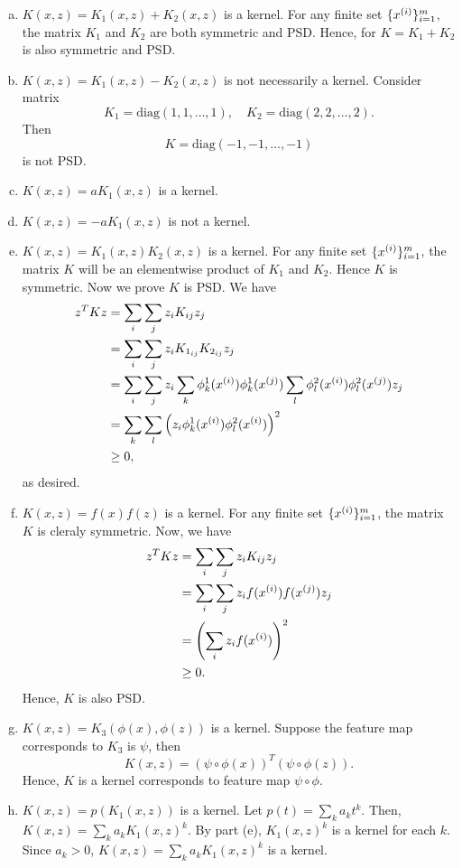 \documentclass[12pt,letterpaper,boxed]{hmcpset}
\renewcommand{\diag}{\mathrm{diag}}
\begin{document}
\begin{solution}
  \begin{enumerate}[(a)]
    \item $K(x,z) = K_1(x,z) + K_2(x,z)$ is a kernel. For any finite set $\{\xx\}_{i=1}^m$, the matrix $K_1$ and $K_2$ are both symmetric and PSD. Hence, for $K = K_1 + K_2$ is also symmetric and PSD.
    
    \item $K(x,z) = K_1(x,z) - K_2(x,z)$ is not necessarily a kernel. Consider matrix
    \[
    K_1 = \diag(1,1,\dots,1), \quad K_2 = \diag(2,2,\dots,2).
    \]
    Then
    \[
    K = \diag(-1,-1,\dots,-1)
    \]
    is not PSD.
    
    \item $K(x,z) = aK_1(x,z)$ is a kernel.
    
    \item $K(x,z) = -aK_1(x,z)$ is not a kernel.
    
    \item $K(x,z) = K_1(x,z)K_2(x,z)$ is a kernel. For any finite set $\{\xx\}_{i=1}^m$, the matrix $K$ will be an elementwise product of $K_1$ and $K_2$. Hence $K$ is symmetric. Now we prove $K$ is PSD. We have
    \[
    \begin{aligned}
      z^T K z &= \sum_i \sum_j z_i K_{ij} z_j \\
      &= \sum_i \sum_j z_i K_{1_{ij}} K_{2_{ij}} z_j \\
      &= \sum_i \sum_j z_i \sum_k \phi_k^1(\xx) \phi_k^1(x^{(j)}) \sum_l \phi_l^2(\xx) \phi_l^2(x^{(j)}) z_j \\
      &= \sum_k \sum_l \qty(z_i \phi_k^1(\xx) \phi_l^2(\xx))^2 \\
      &\geq 0,
    \end{aligned}
    \]
    as desired.
    
    \item $K(x,z) = f(x)f(z)$ is a kernel. For any finite set $\{\xx\}_{i=1}^m$, the matrix $K$ is cleraly symmetric. Now, we have
    \[
    \begin{aligned}
      z^T K z &= \sum_i \sum_j z_i K_{ij} z_j \\
      &= \sum_i \sum_j z_i f(\xx) f(x^{(j)}) z_j \\
      &= \qty(\sum_i z_i f(\xx))^2 \\
      & \geq 0.
    \end{aligned}
    \]
    Hence, $K$ is also PSD.

    \item $K(x,z) = K_3(\phi(x),\phi(z))$ is a kernel. Suppose the feature map corresponds to $K_3$ is $\psi$, then
    \[
    K(x,z) = (\psi \circ \phi(x))^T (\psi \circ \phi(z)).
    \]
    Hence, $K$ is a kernel corresponds to feature map $\psi \circ \phi$.

    \item $K(x,z) = p(K_1(x,z))$ is a kernel. Let $p(t) = \sum_{k} a_k t^k$. Then, $K(x,z) = \sum_k a_k K_1(x,z)^k$. By part (e), $K_1(x,z)^k$ is a kernel for each $k$. Since $a_k > 0$, $K(x,z) = \sum_k a_k K_1(x,z)^k$ is a kernel.
  \end{enumerate}
\end{solution}
\end{document}
